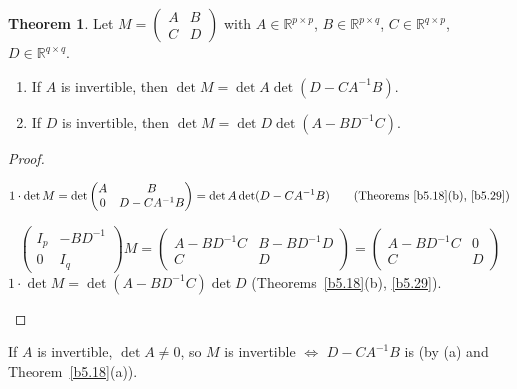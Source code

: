 \documentclass[12pt]{article}
\newcommand{\R}{\mathbb R}
\newcommand{\C}{\mathbb C}
\theoremstyle{definition}
\newtheorem{theorem}{Theorem}
\begin{document}
\begin{theorem}\label{b5.30}
Let \(M=\begin{pmatrix}A&B\\C&D\end{pmatrix}\) with \(A\in\R^{p\times p}\), \(B\in\R^{p\times q}\), \(C\in\R^{q\times p}\),
\(D\in\R^{q\times q}\).
\begin{enumerate}
\item If \(A\) is invertible, then \(\det M=\det A\det(D-CA^{-1}B)\).
\item If \(D\) is invertible, then \(\det M=\det D\det(A-BD^{-1}C)\).
\end{enumerate}
\end{theorem}
\begin{proof}
\begin{board}[(a) The left factor of Theorem~\ref{b5.9} (\(n=q\)) is lower triangular with diagonal entries \(1\) (the lines after
Theorem~\ref{b5.21}):]
\[
1\cdot\det M=\det\begin{pmatrix}A&B\\0&D-CA^{-1}B\end{pmatrix}=\det A\det(D-CA^{-1}B)\qquad
\text{(Theorems~\ref{b5.18}(b), \ref{b5.29})}
\]
\end{board}
\begin{board}
\[
\begin{pmatrix}I_p&-BD^{-1}\\0&I_q\end{pmatrix}M=\begin{pmatrix}A-BD^{-1}C&B-BD^{-1}D\\C&D\end{pmatrix}
=\begin{pmatrix}A-BD^{-1}C&0\\C&D\end{pmatrix}
\]
\(1\cdot\det M=\det(A-BD^{-1}C)\det D\) (Theorems~\ref{b5.18}(b), \ref{b5.29}).
\end{board}
\nopagebreak
\end{proof}
If \(A\) is invertible, \(\det A\ne0\), so \(M\) is invertible \(\iff\) \(D-CA^{-1}B\) is (by (a) and
Theorem~\ref{b5.18}(a)).
\end{document}
